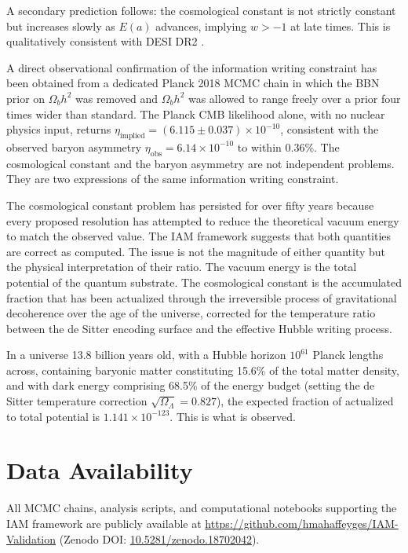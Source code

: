 \documentclass[12pt,a4paper]{article}
\begin{document}
A secondary prediction follows: the cosmological constant is not strictly
constant but increases slowly as $E(a)$ advances, implying $w > -1$ at
late times. This is qualitatively consistent with DESI DR2
\citep{desi2025}.

A direct observational confirmation of the information writing constraint
has been obtained from a dedicated Planck 2018 MCMC chain in which the
BBN prior on $\Omega_b h^2$ was removed and $\Omega_b h^2$ was allowed
to range freely over a prior four times wider than standard. The Planck
CMB likelihood alone, with no nuclear physics input, returns
$\eta_\mathrm{implied} = (6.115 \pm 0.037) \times 10^{-10}$, consistent with
the observed baryon asymmetry $\eta_\mathrm{obs} = 6.14 \times 10^{-10}$
to within $0.36\%$. The cosmological constant and the baryon asymmetry are not
independent problems. They are two expressions of the same information
writing constraint.

The cosmological constant problem has persisted for over fifty years
because every proposed resolution has attempted to reduce the theoretical
vacuum energy to match the observed value. The IAM framework suggests
that both quantities are correct as computed. The issue is not the
magnitude of either quantity but the physical interpretation of their
ratio. The vacuum energy is the total potential of the quantum substrate.
The cosmological constant is the accumulated fraction that has been
actualized through the irreversible process of gravitational decoherence
over the age of the universe, corrected for the temperature ratio between
the de Sitter encoding surface and the effective Hubble writing process.

In a universe 13.8 billion years old, with a Hubble horizon $10^{61}$
Planck lengths across, containing baryonic matter constituting 15.6\% of
the total matter density, and with dark energy comprising 68.5\% of the
energy budget (setting the de Sitter temperature correction
$\sqrt{\Omega_\Lambda} = 0.827$), the expected fraction of actualized to
total potential is $1.141 \times 10^{-123}$. This is what is observed.

\section*{Data Availability}

All MCMC chains, analysis scripts, and computational notebooks supporting
the IAM framework are publicly available at
\url{https://github.com/hmahaffeyges/IAM-Validation}
(Zenodo DOI:
\href{https://doi.org/10.5281/zenodo.18702042}{10.5281/zenodo.18702042}).
\end{document}
